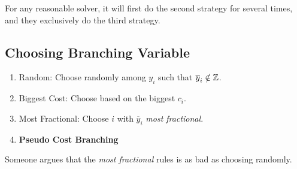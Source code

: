 \begin{remark}
	For any reasonable solver, it will first do the second strategy for several times, and they exclusively do the third strategy.
\end{remark}

\subsection{Choosing Branching Variable}
\begin{enumerate}
	\item Random: Choose randomly among \(y_{i}\) such that \(\overline{y}_{i}\notin\mathbb{\MakeUppercase{Z}}\).
	\item Biggest Cost: Choose based on the biggest \(c_{i}\).
	\item Most Fractional: Choose \(i\) with \(\overline{y}_{i}\) \emph{most fractional}.
	\item \textbf{Pseudo Cost Branching}
\end{enumerate}

\begin{note}
	Someone argues that the \emph{most fractional} rules is as bad as choosing randomly.
\end{note}
